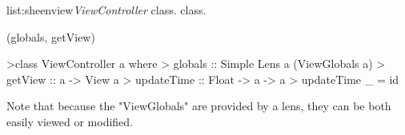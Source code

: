 \vspace{-0.5em}
\begin{listing}{list:sheenview}{\emph{ViewController} class.}{ class.}{}
\end{listing}\vspace{-1.5em}

\functions(globals, getView)
\begin{haskell}

>class ViewController a where
>  globals :: Simple Lens a (ViewGlobals a)
>  getView :: a -> View a
>  updateTime :: Float -> a -> a
>  updateTime _ = id

\end{haskell}
\noindent 

Note that because the "ViewGlobals" are provided by a lens, they can be both easily viewed or modified. 
